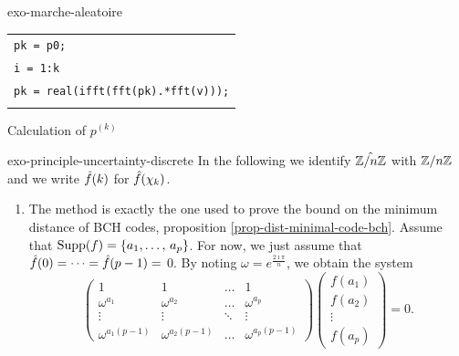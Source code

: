 \begin{correction}{exo-marche-aleatoire}
\begin{enumerate}
\begin{listing} 
\begin{footnotesize} 
{\upshape
\begin{tabular}{l} \texttt{pk = p0;} \\
\texttt{\pfor i = 1:k} \\
\texttt{\quad pk = real(ifft(fft(pk).*fft(v)));} \\
\texttt{\pend} \\
\end{tabular}
} 
\end{footnotesize}
\caption{Calculation of $ p^{(k)} $}
\label{listing-calcul-proba-pk}
\end{listing}
\end{enumerate}
\end{correction}
 
 
\begin{correction}{exo-principle-uncertainty-discrete}
In the following we identify $ \hat{\mathbb{Z}/n \mathbb{Z}} $ with $ \mathbb{Z}/n \mathbb{Z} $ and we write $ \hat{f} (k) $ for $ \hat{f} (\chi_k) $. \begin{enumerate}
\item {}   The method is exactly the one used to prove the bound on the minimum distance of BCH codes, proposition \ref{prop-dist-minimal-code-bch}. Assume that $ \operatorname{Supp} (f) = \{a_1, \ldots, \, a_{p}\} $. For now, we just assume that $ \hat{f} (0) = \cdots = \hat{f} (p-1) = $ 0. By noting $ \omega = e^{\frac{2 \imath \pi}{n}} $, we obtain the system
\begin{equation*}
\begin{pmatrix} 1 & 1 & \ldots & 1 \\\omega^{a_1} & \omega^{a_2} & \ldots & \omega^{a_p} \\\vdots & \vdots & \ddots & \vdots \\\omega^{a_1 (p-1)} & \omega^{a_2 (p-1)} & \ldots & \omega^{a_p (p-1)} \end{pmatrix} \begin{pmatrix} f(a_1) \\f(a_2) \\\vdots \\f(a_p) \end{pmatrix} = 0.
\end{equation*}

\end{enumerate}
\end{correction}
